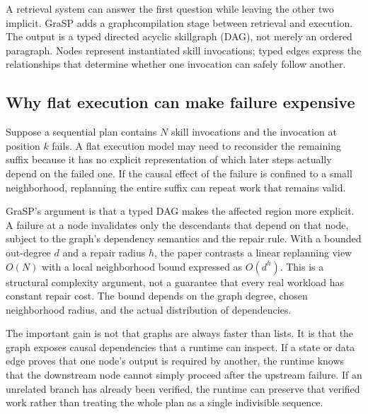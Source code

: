 A retrieval system can answer the first question while leaving the other two implicit. GraSP adds a \gls{graphcompilation} stage between retrieval and execution. The output is a typed directed acyclic \gls{skillgraph} (DAG), not merely an ordered paragraph. Nodes represent instantiated skill invocations; typed edges express the relationships that determine whether one invocation can safely follow another.\autocite{xia2026grasp}

\subsection{Why flat execution can make failure expensive}

Suppose a sequential plan contains \(N\) skill invocations and the invocation at position \(k\) fails. A flat execution model may need to reconsider the remaining suffix because it has no explicit representation of which later steps actually depend on the failed one. If the causal effect of the failure is confined to a small neighborhood, replanning the entire suffix can repeat work that remains valid.

GraSP's argument is that a typed DAG makes the affected region more explicit. A failure at a node invalidates only the descendants that depend on that node, subject to the graph's dependency semantics and the repair rule. With a bounded out-degree \(d\) and a repair radius \(h\), the paper contrasts a linear replanning view \(O(N)\) with a local neighborhood bound expressed as \(O(d^h)\). This is a structural complexity argument, not a guarantee that every real workload has constant repair cost. The bound depends on the graph degree, chosen neighborhood radius, and the actual distribution of dependencies.\autocite{xia2026grasp}

The important gain is not that graphs are always faster than lists. It is that the graph exposes causal dependencies that a runtime can inspect. If a state or data edge proves that one node's output is required by another, the runtime knows that the downstream node cannot simply proceed after the upstream failure. If an unrelated branch has already been verified, the runtime can preserve that verified work rather than treating the whole plan as a single indivisible sequence.


